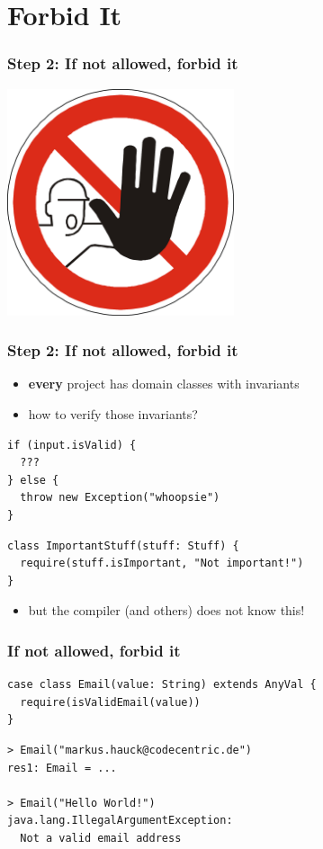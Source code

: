 \documentclass{beamer}
\begin{document}
\section{Forbid It}

\begin{frame}
  \frametitle{Step 2: If not allowed, forbid it}
  \begin{center}
    \includegraphics[width=0.5\textwidth]{../pics/forbidden.png}
  \end{center}
\end{frame}

\begin{frame}
  \frametitle{Step 2: If not allowed, forbid it}
  \begin{itemize}
  \item \textbf{every} project has domain classes with invariants
  \item how to verify those invariants?
  \end{itemize}
\begin{verbatim}
if (input.isValid) {
  ???
} else {
  throw new Exception("whoopsie")
}
\end{verbatim}
\begin{verbatim}
class ImportantStuff(stuff: Stuff) {
  require(stuff.isImportant, "Not important!")
}
\end{verbatim}
  \begin{itemize}
  \item but the compiler (and others) does not know this!
  \end{itemize}
\end{frame}

\begin{frame}[fragile]
  \frametitle{If not allowed, forbid it}
\begin{verbatim}
case class Email(value: String) extends AnyVal {
  require(isValidEmail(value))
}
\end{verbatim}
\begin{verbatim}
> Email("markus.hauck@codecentric.de")
res1: Email = ...

> Email("Hello World!")
java.lang.IllegalArgumentException: 
  Not a valid email address                      
\end{verbatim}
\end{frame}
\end{document}
